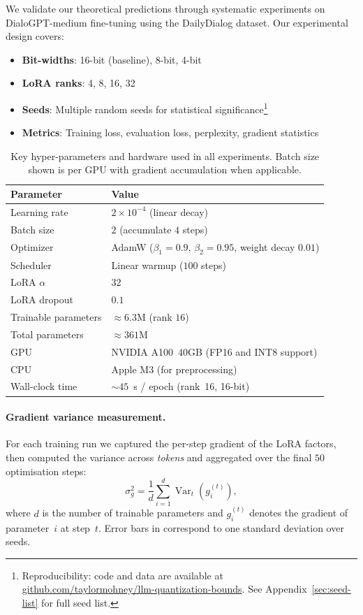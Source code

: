 \documentclass[10pt,twocolumn]{article}
\begin{document}
We validate our theoretical predictions through systematic experiments on DialoGPT-medium fine-tuning using the DailyDialog dataset. Our experimental design covers:

\begin{itemize}
\item \textbf{Bit-widths}: 16-bit (baseline), 8-bit, 4-bit
\item \textbf{LoRA ranks}: 4, 8, 16, 32
\item \textbf{Seeds}: Multiple random seeds for statistical significance\footnote{Reproducibility: code and data are available at \href{https://github.com/taylormohney/llm-quantization-bounds}{github.com/taylormohney/llm-quantization-bounds}. See Appendix~\ref{sec:seed-list} for full seed list.}
\item \textbf{Metrics}: Training loss, evaluation loss, perplexity, gradient statistics
\end{itemize}

\begin{table}[t]
\centering
\caption{Key hyper-parameters and hardware used in all experiments. Batch size shown is per GPU with gradient accumulation when applicable.}
\label{tab:hyperparams}
\begin{tabular}{@{}ll@{}}
\toprule
\textbf{Parameter} & \textbf{Value} \\
\midrule
Learning rate & $2\times10^{-4}$ (linear decay) \\
Batch size & $2$ (accumulate $4$ steps) \\
Optimizer & AdamW ($\beta_1{=}0.9,\,\beta_2{=}0.95$, weight decay $0.01$) \\
Scheduler & Linear warmup ($100$ steps) \\
LoRA $\alpha$ & $32$ \\
LoRA dropout & $0.1$ \\
Trainable parameters & $\approx6.3$M (rank $16$) \\
Total parameters & $\approx361$M \\
GPU & NVIDIA A100~40GB (FP16 and INT8 support) \\
CPU & Apple M3 (for preprocessing) \\
Wall-clock time & $\sim45$~s / epoch (rank~16, 16-bit) \\
\bottomrule
\end{tabular}
\end{table}

\paragraph{Gradient variance measurement.} For each training run we captured the per-step gradient of the LoRA factors, then computed the variance across \emph{tokens} and aggregated over the final $50$ optimisation steps:
\[
\sigma_{g}^{2} = \frac{1}{d}\sum_{i=1}^{d} \operatorname{Var}_{t}(g_{i}^{(t)}),
\]
where $d$ is the number of trainable parameters and $g_{i}^{(t)}$ denotes the gradient of parameter~$i$ at step~$t$. Error bars in  correspond to one standard deviation over seeds.
\end{document}
